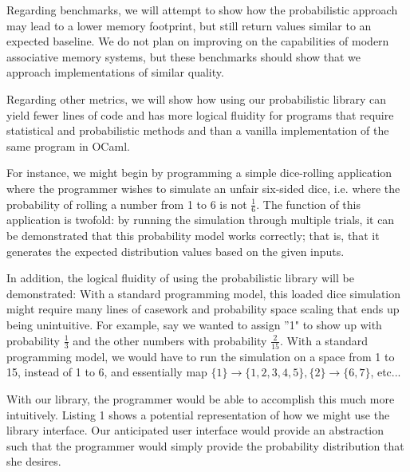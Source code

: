 \documentclass{sig-alternate}
\begin{document}
Regarding benchmarks, we will attempt to show how the probabilistic approach may lead to 
a lower memory footprint, but still return values similar to an expected baseline.
We do not plan on improving on the capabilities of modern associative memory
systems, but these benchmarks should show that we approach implementations of similar
quality. 

Regarding other metrics, we will show how using our probabilistic library can yield 
fewer lines of code and has more logical fluidity for programs that require statistical 
and probabilistic methods and than a vanilla implementation of the same program in OCaml. 

For instance, we might begin by programming a simple dice-rolling application where the programmer wishes
to simulate an unfair six-sided dice, i.e. where the probability of rolling a number from 1 to 6 is not $\frac{1}{6}$.
The function of this application is twofold: by running the simulation through multiple trials, it can be demonstrated 
that this probability model works correctly; that is, that it generates the expected distribution values
based on the given inputs.

In addition, the logical fluidity of using the probabilistic library will be demonstrated:
With a standard programming model, this loaded dice simulation might require many lines of casework and probability space scaling
that ends up being unintuitive. For example, say we wanted to assign ''1" to show up with probability $\frac{1}{3}$
and the other numbers with probability $\frac{2}{15}$. With a standard programming model, we would have to run the simulation on a space from
1 to 15, instead of 1 to 6, and essentially map $\{1\} \rightarrow \{1, 2, 3, 4, 5\}, \{2\} \rightarrow \{6, 7\}$, etc...

With our library, the programmer would be able to accomplish this much more intuitively. Listing 1 shows a potential representation of how we might use the library interface. Our
anticipated user interface would provide an abstraction such that the programmer would simply
provide the probability distribution that she desires.
\end{document}

